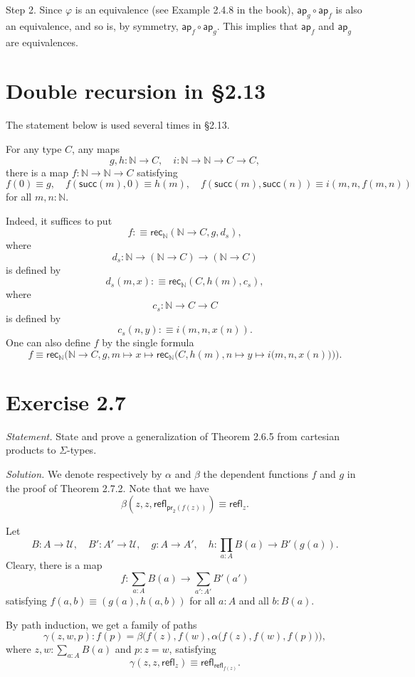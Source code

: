 \documentclass[12pt]{article}
\newcommand{\ap}{\mathsf{ap}}
\newcommand{\N}{\mathbb N}
\newcommand{\nn}{\noindent}
\newcommand{\pr}{\mathsf{pr}}
\newcommand{\rec}{\mathsf{rec}}
\newcommand{\refl}{\mathsf{refl}}
\newcommand{\su}{\mathsf{succ}}
\newcommand{\U}{\mathcal U}
\begin{document}
Step 2. Since $\varphi$ is an equivalence (see Example 2.4.8 in the book), $\ap_g\circ\ap_f$ is also an equivalence, and so is, by symmetry, $\ap_f\circ\ap_g$. This implies that $\ap_f$ and $\ap_g$ are equivalences.



\section{Double recursion in \S2.13}

The statement below is used several times in \S2.13.

For any type $C$, any maps 
$$
g,h:\N\to C,\quad i:\N\to\N\to C\to C,
$$ 
there is a map $f:\N\to\N\to C$ satisfying 
$$
f(0)\equiv g,\quad f(\su(m),0)\equiv h(m),\quad f(\su(m),\su(n))\equiv i(m,n,f(m,n))
$$ 
for all $m,n:\N$.

Indeed, it suffices to put 
$$
f:\equiv\rec_\N(\N\to C,g,d_s),
$$ 
where 
$$
d_s:\N\to(\N\to C)\to(\N\to C)
$$ 
is defined by 
$$
d_s(m,x):\equiv\rec_\N(C,h(m),c_s),
$$ 
where 
$$
c_s:\N\to C\to C
$$ 
is defined by 
$$
c_s(n,y):\equiv i(m,n,x(n)).
$$ 
One can also define $f$ by the single formula
$$
f\equiv\rec_\N\Bigg(\N\to C,g,m\mapsto x\mapsto\rec_\N\bigg(C,h(m),n\mapsto y\mapsto i\big(m,n,x(n)\big)\bigg)\Bigg).
$$


\section{Exercise 2.7}

\emph{Statement.} State and prove a generalization of Theorem 2.6.5 from cartesian products to $\Sigma$-types. 

\nn\emph{Solution.} We denote respectively by $\alpha$ and $\beta$ the dependent functions $f$ and $g$ in the proof of Theorem 2.7.2. Note that we have 
$$
\beta(z,z,\refl_{\pr_2(f(z))})\equiv\refl_z.
$$

Let 
$$
B:A\to\U,\quad B':A'\to\U,\quad g:A\to A',\quad h:\prod_{a:A}B(a)\to B'(g(a)).
$$ 
Cleary, there is a map 
$$
f:\sum_{a:A}B(a)\to\sum_{a':A'}B'(a')
$$ 
satisfying $f(a,b)\equiv (g(a),h(a,b))$ for all $a:A$ and all $b:B(a)$. 

By path induction, we get a family of paths 
$$
\gamma(z,w,p):f(p)=\beta\Big(f(z),f(w),\alpha\big(f(z),f(w),f(p)\big)\Big),
$$ 
where $z,w:\sum_{a:A}B(a)$ and $p:z=w$, satisfying 
$$
\gamma(z,z,\refl_z)\equiv\refl_{\refl_{f(z)}}.
$$
\end{document}
